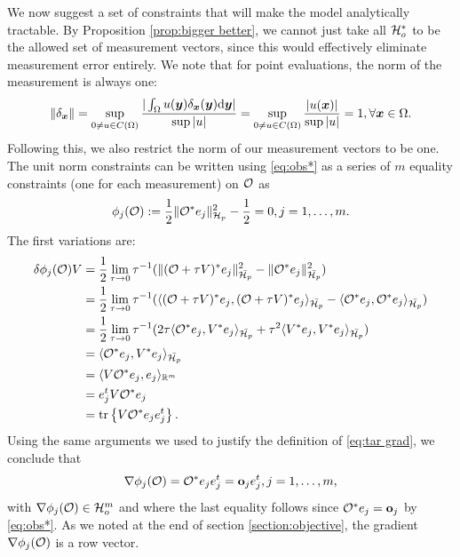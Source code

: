 \documentclass{amsart}
\numberwithin{equation}{section}
\begin{document}
We now suggest a set of constraints that will make the model
analytically tractable. By Proposition \ref{prop:bigger better}, we
cannot just take all $\mathcal{H}_o^*$ to be the allowed set of measurement
vectors, since this would effectively eliminate measurement error
entirely. We note that for point evaluations, the norm of the
measurement is always one:
\begin{align*}
  \| \delta_{{\boldsymbol{x}}} \| = \sup_{0 \neq u \in C(\Omega)} \frac{
    |\int_{\Omega}u({\boldsymbol{y}}) \delta_{{\boldsymbol{x}}}({\boldsymbol{y}}) \text{\textup{d}} {\boldsymbol{y}}| 
  }{
    \sup|u|}
  = \sup_{0 \neq u \in C(\Omega)} \frac{|u({\boldsymbol{x}})|}{ \sup|u|} = 1,
  \forall {\boldsymbol{x}} \in \Omega.
\end{align*}
Following this, we also restrict the norm of our measurement vectors
to be one. The unit norm constraints can be written using
\eqref{eq:obs*} as a series of $m$ equality constraints (one for each
measurement) on $\mathcal{O}$ as
\begin{align}\label{eq:constraints}
  \phi_j(\mathcal{O}) :=\frac12 \| \mathcal{O}^* e_j\|_{\mathcal{H}_p}^2 - \frac12 = 0,j=1,\dots,m.
\end{align}
The first variations are:
\begin{align*}
  \delta \phi_j(\mathcal{O})V  
  &= \frac12\lim_{\tau \to 0}\tau^{-1}
  ( \|(\mathcal{O} + \tau V)^*e_j \|_{\bar{\mathcal{H}_p}}^2 - \|\mathcal{O} ^*e_j \|_{\bar{\mathcal{H}_p}}^2  ) \\
  &= \frac12\lim_{\tau \to 0}\tau^{-1}
  ( \langle (\mathcal{O} + \tau V)^*e_j, (\mathcal{O} + \tau V)^*e_j \rangle_{\bar{\mathcal{H}_p}} - 
  \langle \mathcal{O}^*e_j, \mathcal{O}^*e_j \rangle_{\bar{\mathcal{H}_p}} ) \\
  &= \frac12\lim_{\tau \to 0}\tau^{-1}
  (2\tau \langle \mathcal{O}^*e_j,V^*e_j \rangle_{\bar{\mathcal{H}_p}} 
  +\tau^2 \langle V^*e_j, V^*e_j \rangle_{\bar{\mathcal{H}_p}} ) \\
  &= \langle \mathcal{O}^*e_j,V^*e_j \rangle_{\bar{\mathcal{H}_p}} \\
  &= \langle V \mathcal{O}^*e_j,e_j \rangle_{\mathbb{R}^m} \\
  &= e_j^t V \mathcal{O}^* e_j \\
  &= \textup{tr}\left \{V \mathcal{O}^* e_je_j^t \right \}.
\end{align*}
Using the same arguments we used to justify the definition of
\eqref{eq:tar grad}, we conclude that
\begin{align}\label{eq:grad constraints}
\nabla \phi_j(\mathcal{O}) = \mathcal{O}^* e_j e_j^t = \mathbf{o}_j e_j^t , j=1,\dots,m,
\end{align}
with $\nabla \phi_j(\mathcal{O}) \in \mathcal{H}_o^m$ and where the
last equality follows since $\mathcal{O}^*e_j = \mathbf{o}_j$ by \eqref{eq:obs*}. As
we noted at the end of section \ref{section:objective}, the
gradient $\nabla \phi_j(\mathcal{O})$ is a row vector.
\end{document}
